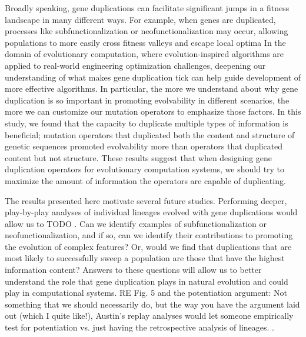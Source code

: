 Broadly speaking, gene duplications can facilitate significant jumps in a fitness landscape in many different ways.
For example, when genes are duplicated, processes like subfunctionalization or neofunctionalization may occur, allowing populations to more easily cross fitness valleys and escape local optima
In the domain of evolutionary computation, where evolution-inspired algorithms are applied to real-world engineering optimization challenges, deepening our understanding of what makes gene duplication tick can help guide development of more effective algorithms.
In particular, the more we understand about why gene duplication is so important in promoting evolvability in different scenarios, the more we can customize our mutation operators to emphasize those factors.
In this study, we found that the capacity to duplicate multiple types of information is beneficial; mutation operators that duplicated both the content and structure of genetic sequences promoted evolvability more than operators that duplicated content but not structure.
These results suggest that when designing gene duplication operators for evolutionary computation systems, we should try to maximize the amount of information the operators are capable of duplicating.


The results presented here motivate several future studies.
Performing deeper, play-by-play analyses of individual lineages evolved with gene duplications would allow us to TODO \citep{mcphee2018detailed}.
Can we identify examples of subfunctionalization or neofunctionalization, and if so, can we identify their contributions to promoting the evolution of complex features?
Or, would we find that duplications that are most likely to successfully sweep a population are those that have the highest information content?
Answers to these questions will allow us to better understand the role that gene duplication plays in natural evolution and could play in computational systems.
RE Fig. 5 and the potentiation argument: Not something that we should necessarily do, but the way you have the argument laid out (which I quite like!), Austin's replay analyses would let someone empirically test for potentiation vs. just having the retrospective analysis of lineages.
\citep{blount2018contingency,Ferguson2023}.

